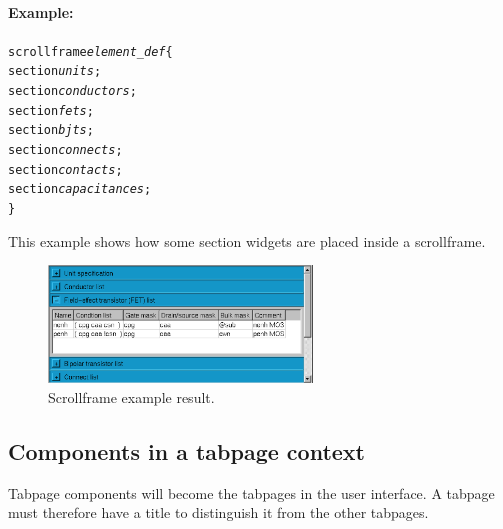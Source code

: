 
\paragraph{Example:}
\begin{alltt}
scrollframe \emph{element_def} \{
    section \emph{units};
    section \emph{conductors};
    section \emph{fets};
    section \emph{bjts};
    section \emph{connects};
    section \emph{contacts};
    section \emph{capacitances};
\}
\end{alltt}
\noindent This example shows how some section widgets are placed inside a
scrollframe.

\begin{figure}[h!] \begin{center}
\includegraphics[width=7cm]{./figures/ex_scrollframe.eps}
\caption{Scrollframe example result.}
\end{center} \end{figure}


\subsection{Components in a tabpage context}
Tabpage components will become the tabpages in the user interface. A tabpage
must therefore have a title to distinguish it from the other tabpages.

